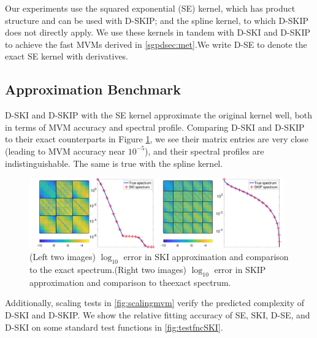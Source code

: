 Our experiments use the squared exponential (SE) kernel, which has product
structure and can be used with D-SKIP; and the spline kernel, to which D-SKIP
does not directly apply. We use these kernels in tandem with D-SKI and D-SKIP
to achieve the fast MVMs derived in \cref{sgpdsec:met}.We write D-SE to denote the exact SE kernel with derivatives.

\subsection{Approximation Benchmark}
D-SKI and D-SKIP with the SE kernel approximate the original kernel well, both
in terms of MVM accuracy and spectral profile. Comparing D-SKI and D-SKIP to
their exact counterparts in Figure \ref{fig:error_ski}, we see their matrix
entries are very close (leading to MVM accuracy near $10^{-5}$), and their
spectral profiles are indistinguishable. The same is true with the spline
kernel.

\begin{figure}[ht]
  \begin{center}
    \includegraphics[width=0.98\textwidth]{./sgpd/pics/ski_error}
    \caption{(Left two images) $\log_{10}$ error in SKI approximation and
    comparison to the exact spectrum.(Right two images) $\log_{10}$ error in
    SKIP approximation and comparison to theexact spectrum.}
    \label{fig:error_ski}
  \end{center}
\end{figure}

Additionally, scaling tests in \cref{fig:scalingmvm} verify the predicted
complexity of D-SKI and D-SKIP. We show the relative fitting accuracy of SE,
SKI, D-SE, and D-SKI on some standard test functions in \cref{fig:testfncSKI}.


